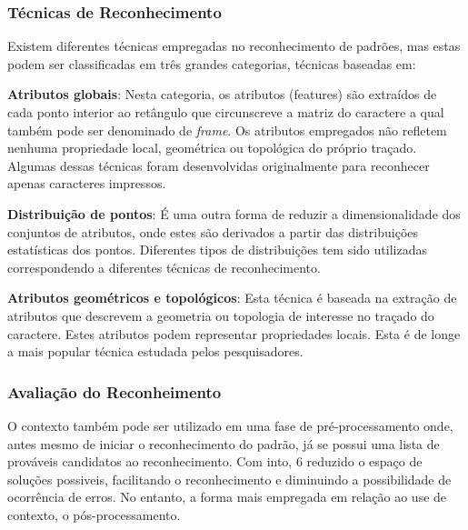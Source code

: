 		\subsubsection{Técnicas de Reconhecimento}
		Existem diferentes técnicas empregadas no reconhecimento de padrões, mas estas podem ser classificadas em três grandes categorias, técnicas baseadas em:
		\begin{description}
			\item \textbf{Atributos globais}: Nesta categoria, os atributos (features) são extraídos de cada ponto interior ao retângulo que circunscreve a matriz do caractere a qual também pode ser denominado de \textit{frame}. Os atributos empregados não refletem nenhuma propriedade local, geométrica ou topológica do próprio traçado. Algumas dessas técnicas foram desenvolvidas originalmente para reconhecer apenas caracteres impressos.
			\item \textbf{Distribuição de pontos}: É uma outra forma de reduzir a dimensionalidade dos conjuntos de atributos, onde estes são derivados a partir das distribuições estatísticas dos pontos. Diferentes tipos de distribuições tem sido utilizadas correspondendo a diferentes técnicas de reconhecimento.
			\item \textbf{Atributos geométricos e topológicos}: Esta técnica é baseada na extração de atributos que descrevem a geometria ou topologia de interesse no traçado do caractere. Estes atributos podem representar propriedades locais. Esta é de longe a mais popular técnica estudada pelos pesquisadores. 
		\end{description}
	
		\subsubsection{Avaliação do Reconheimento}
		O contexto também pode ser utilizado em uma fase
		de pré-processamento onde, antes mesmo de iniciar o
		reconhecimento do padrão, já se possui uma lista de
		prováveis candidatos ao reconhecimento. Com into, 6 reduzido
		o espaço de soluções possiveis, facilitando o reconhecimento
		e diminuindo a possibilidade de ocorrência de erros. No
		entanto, a forma mais empregada em relação ao use de
		contexto, o pós-processamento.